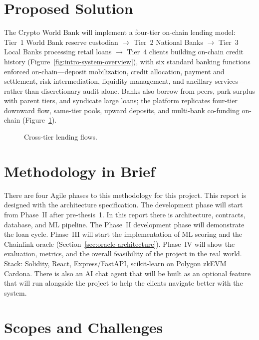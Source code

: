 \section{Proposed Solution}
\label{sec:proposed-solution}

The Crypto World Bank will implement a four-tier on-chain lending model: Tier~1 World Bank reserve custodian $\to$ Tier~2 National Banks $\to$ Tier~3 Local Banks processing retail loans $\to$ Tier~4 clients building on-chain credit history (Figure~\ref{fig:intro-system-overview}), with six standard banking functions enforced on-chain---deposit mobilization, credit allocation, payment and settlement, risk intermediation, liquidity management, and ancillary services---rather than discretionary audit alone.
\label{sec:banking-functions}
Banks also borrow from peers, park surplus with parent tiers, and syndicate large loans; the platform replicates four-tier downward flow, same-tier pools, upward deposits, and multi-bank co-funding on-chain (Figure~\ref{fig:cross-tier-lending}).
\label{sec:cross-tier-lending}

\begin{figure}[H]
\centering
{}
\caption[Cross-tier lending flows]{Cross-tier lending flows.}
\label{fig:cross-tier-lending}
\end{figure}

\section{Methodology in Brief}

There are four Agile phases to this methodology for this project. This report is designed with the architecture specification. The development phase will start from Phase~II after pre-thesis~1. In this report there is architecture, contracts, database, and ML pipeline. The Phase~II development phase will demonstrate the loan cycle. Phase~III will start the implementation of ML scoring and the Chainlink oracle (Section~\ref{sec:oracle-architecture}). Phase~IV will show the evaluation, metrics, and the overall feasibility of the project in the real world. Stack: Solidity, React, Express/FastAPI, scikit-learn on Polygon zkEVM Cardona. There is also an AI chat agent that will be built as an optional feature that will run alongside the project to help the clients navigate better with the system.

\section{Scopes and Challenges}
\label{sec:scopes-challenges}

